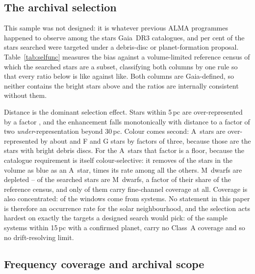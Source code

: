 \subsection{The archival selection}
\label{sec:bias}

This sample was not designed: it is whatever previous ALMA programmes
happened to observe among the stars Gaia~DR3 catalogues, and
\PctDiscProposal{} per cent of the stars searched were targeted under a
debris-disc or planet-formation proposal. Table~\ref{tab:selfunc} measures
the bias against a volume-limited reference census of which the searched
stars are a subset, classifying both columns by one rule so that every ratio
below is like against like. Both columns are Gaia-defined, so neither
contains the bright stars above and the ratios are internally consistent
without them.

Distance is the dominant selection effect. Stars within 5\,pc are
over-represented by a factor \SfTopRatio, and the enhancement falls
monotonically with distance to a factor of two \emph{under}-representation
beyond 30\,pc. Colour comes second: A~stars are over-represented by about
\SfARatio{} and F and G stars by factors of three, because those are the
stars with bright debris discs. For the A~stars that factor is a floor,
because the catalogue requirement is itself colour-selective: it removes
\BsNEarly{} of the \BsNEarlyVol{} stars in the volume as blue as an A~star,
\BsEarlyRatio{} times its rate among all the others. M~dwarfs are depleted
--
\SfMSearched{} of the \SfNStar{} searched stars are M~dwarfs, a factor
\SfMRatio{} of their share of the reference census, and only
\SfMClassAStars{} of them carry fine-channel coverage at all. Coverage is also concentrated:
\ConcThreeWin{} of the \NWindows{} windows come from \ConcThreeSys{}
systems. No statement in this paper is therefore an occurrence rate for the
solar neighbourhood, and the selection acts hardest on
exactly the targets a designed search would pick: of the \CsIntNRow{} sample
systems within 15\,pc with a confirmed planet, \CsIntNoClassA{} carry no
Class~A coverage and so no drift-resolving limit.




\subsection{Frequency coverage and archival scope}
\label{sec:coverage}


